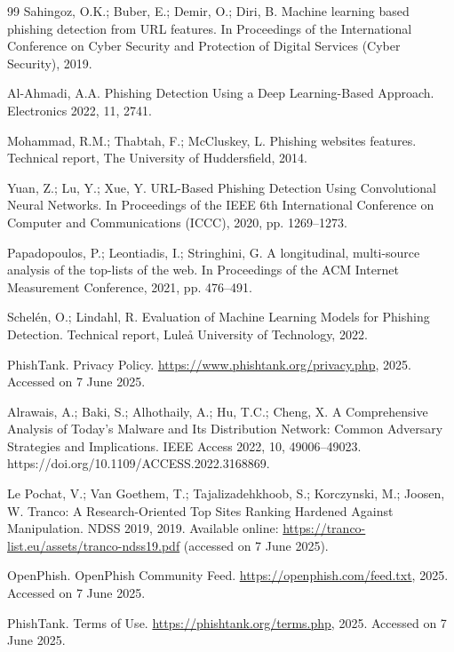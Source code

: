 \documentclass[journal,article,submit,pdftex,moreauthors]{Definitions/mdpi}
\begin{document}
\begin{thebibliography}{99}
Sahingoz, O.K.; Buber, E.; Demir, O.; Diri, B. Machine learning based phishing detection from URL features. In Proceedings of the International Conference on Cyber Security and Protection of Digital Services (Cyber Security), 2019.

Al-Ahmadi, A.A. Phishing Detection Using a Deep Learning-Based Approach. Electronics 2022, 11, 2741.

Mohammad, R.M.; Thabtah, F.; McCluskey, L. Phishing websites features. Technical report, The University of Huddersfield, 2014.

Yuan, Z.; Lu, Y.; Xue, Y. URL-Based Phishing Detection Using Convolutional Neural Networks. In Proceedings of the IEEE 6th International Conference on Computer and Communications (ICCC), 2020, pp. 1269–1273.

Papadopoulos, P.; Leontiadis, I.; Stringhini, G. A longitudinal, multi-source analysis of the top-lists of the web. In Proceedings of the ACM Internet Measurement Conference, 2021, pp. 476–491.

Schelén, O.; Lindahl, R. Evaluation of Machine Learning Models for Phishing Detection. Technical report, Luleå University of Technology, 2022.

PhishTank. Privacy Policy. \url{https://www.phishtank.org/privacy.php}, 2025. Accessed on 7 June 2025.

Alrawais, A.; Baki, S.; Alhothaily, A.; Hu, T.C.; Cheng, X. A Comprehensive Analysis of Today's Malware and Its Distribution Network: Common Adversary Strategies and Implications. IEEE Access 2022, 10, 49006–49023. https://doi.org/10.1109/ACCESS.2022.3168869.

Le Pochat, V.; Van Goethem, T.; Tajalizadehkhoob, S.; Korczynski, M.; Joosen, W. Tranco: A Research-Oriented Top Sites Ranking Hardened Against Manipulation. NDSS 2019, 2019. Available online: \url{https://tranco-list.eu/assets/tranco-ndss19.pdf} (accessed on 7 June 2025).

OpenPhish. OpenPhish Community Feed. \url{https://openphish.com/feed.txt}, 2025. Accessed on 7 June 2025.

PhishTank. Terms of Use. \url{https://phishtank.org/terms.php}, 2025. Accessed on 7 June 2025.


\end{thebibliography}
\end{document}
